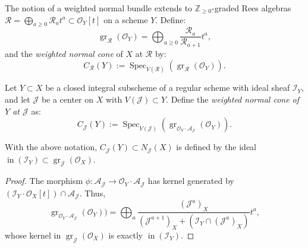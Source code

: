 \documentclass{amsart}
\newcommand{\ZZ}{{\mathbb{Z}}}
\newcommand{\cA}{{\mathcal A}}
\newcommand{\cI}{{\mathcal I}}
\newcommand{\cJ}{{\mathcal J}}
\newcommand{\cO}{{\mathcal O}}
\renewcommand{\cR}{{\mathcal R}}
\newcommand{\inn}{\operatorname{in}}
\newcommand{\Spec}{\operatorname{Spec}}
\newcommand{\gr}{{\operatorname{gr}}}
\begin{document}
The notion of a weighted normal bundle extends to $\ZZ_{\geq 0}$-graded Rees algebras \( \cR = \bigoplus_{a \geq 0} \cR_a t^a \subset \cO_Y[t] \) on a scheme $Y$. Define:
\[
\gr_{\cR}(\cO_Y) = \bigoplus_{a \geq 0} \frac{\cR_a}{\cR_{a+1}} t^a,
\]
and the {\it weighted normal cone}  of \( X \) at \( \cR \) by:
\[
C_{\cR}(Y) := \Spec_{V(\cR)}(\gr_{\cR}(\cO_Y)).
\]

\begin{definition}
Let \( Y \subset X \) be a closed integral subscheme of a regular scheme with ideal sheaf \( \cI_Y \), and let \( \cJ \) be a center on \( X \) with \( V(\cJ) \subset Y \). Define  the {\it weighted normal cone of \( Y \) at \( \cJ \)} as:
\[
C_{\cJ}(Y) := \Spec_{V(\cJ)}(\gr_{\cO_Y \cdot \cA_{\cJ}}(\cO_Y)).
\]
\end{definition}

\begin{lemma}\label{normal}
With the above notation, \( C_{\cJ}(Y) \subset N_{\cJ}(X) \) is defined by the ideal \( \inn(\cI_Y) \subset \gr_{\cJ}(\cO_X) \).
\end{lemma}

\begin{proof}
The morphism \( \phi: \cA_{\cJ} \to \cO_Y \cdot \cA_{\cJ} \) has kernel generated by \( (\cI_Y \cdot \cO_X[t]) \cap \cA_{\cJ} \). Thus,
\[
\gr_{\cO_Y \cdot \cA_{\cJ}}(\cO_Y)) = \bigoplus_a \frac{(\cJ^a)_X}{(\cJ^{a+1})_X + (\cI_Y \cap (\cJ^a)_X)} t^a,
\]
whose kernel in \( \gr_{\cJ}(\cO_X) \) is exactly \( \inn(\cI_Y) \).
\end{proof}
\end{document}
